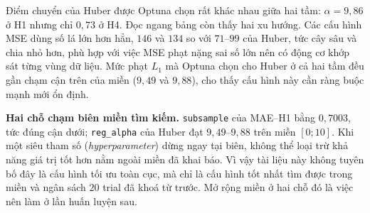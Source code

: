 \documentclass[12pt, a4paper]{report}
\begin{document}
\begin{table}[htbp]
\centering
\caption{Siêu tham số tốt nhất do Optuna chọn, theo từng hàm mất mát và tầm dự báo. Cả sáu cấu
hình dùng chung \texttt{random\_state} $=42$, \texttt{deterministic} $=$ true và
\texttt{max\_bin} $=127$ trên CPU. Đọc từ khoá \texttt{best\_params} trong tệp kết quả của mỗi
notebook huấn luyện.}
\label{tab:sieu_tham_so}
\scriptsize
{}
\end{table}

Điểm chuyển của Huber được Optuna chọn rất khác nhau giữa hai tầm: $\alpha = 9{,}86$ ở H1 nhưng
chỉ $0{,}73$ ở H4. Đọc ngang bảng còn thấy hai xu hướng. Các cấu hình MSE dùng số lá lớn hơn
hẳn, $146$ và $134$ so với $71$--$99$ của Huber, tức cây sâu và chia nhỏ hơn, phù hợp với
việc MSE phạt nặng sai số lớn nên có động cơ khớp sát từng vùng dữ liệu. Mức phạt $L_1$ mà
Optuna chọn cho Huber ở cả hai tầm đều gần chạm cận trên của miền ($9{,}49$ và $9{,}88$), cho
thấy cấu hình này cần ràng buộc mạnh mới ổn định.

\textbf{Hai chỗ chạm biên miền tìm kiếm.} \texttt{subsample} của MAE--H1 bằng $0{,}7003$, tức
đúng cận dưới; \texttt{reg\_alpha} của Huber đạt $9{,}49$--$9{,}88$ trên miền $[0;10]$. Khi một
siêu tham số (\textit{hyperparameter}) dừng ngay tại biên, không thể loại trừ khả năng giá trị tốt hơn nằm ngoài miền đã
khai báo. Vì vậy tài liệu này không tuyên bố đây là cấu hình tối ưu toàn cục, mà chỉ là cấu
hình tốt nhất tìm được trong miền và ngân sách $20$ trial đã khoá từ trước. Mở rộng miền ở hai
chỗ đó là việc nên làm ở lần huấn luyện sau.
\end{document}
